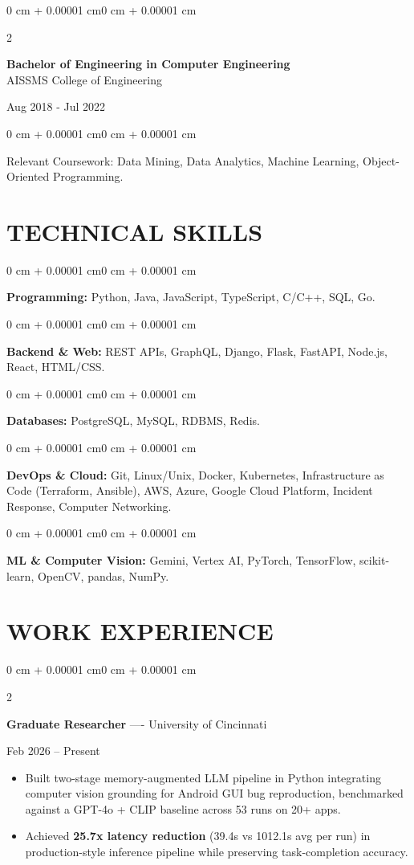 \documentclass[10pt, letterpaper]{article}
\newenvironment{highlights}{
    \begin{itemize}[
        topsep=0.10 cm,
        parsep=0.06 cm,
        partopsep=0pt,
        itemsep=0.06 cm,
        leftmargin=12pt
    ]
}{
    \end{itemize}
}
\newenvironment{onecolentry}{
    \begin{adjustwidth}{0 cm + 0.00001 cm}{0 cm + 0.00001 cm}
}{
    \end{adjustwidth}
}
\newenvironment{twocolentry}[2][]{
    \onecolentry
    \def\secondColumn{#2}
    \setcolumnwidth{\fill, 4.5 cm}
    \begin{paracol}{2}
}{
    \switchcolumn \raggedleft \secondColumn
    \end{paracol}
    \endonecolentry
}
\begin{document}
\begin{twocolentry}{
    Aug 2018 - Jul 2022
}
    \textbf{Bachelor of Engineering in Computer Engineering} \\
    AISSMS College of Engineering
\end{twocolentry}
\begin{onecolentry}
Relevant Coursework: Data Mining, Data Analytics, Machine Learning, Object-Oriented Programming.
\end{onecolentry}
\section{TECHNICAL SKILLS}
\begin{onecolentry}
\textbf{Programming:} Python, Java, JavaScript, TypeScript, C/C++, SQL, Go.
\end{onecolentry}
\vspace{0.06 cm}
\begin{onecolentry}
\textbf{Backend \& Web:} REST APIs, GraphQL, Django, Flask, FastAPI, Node.js, React, HTML/CSS.
\end{onecolentry}
\vspace{0.06 cm}
\begin{onecolentry}
\textbf{Databases:} PostgreSQL, MySQL, RDBMS, Redis.
\end{onecolentry}
\vspace{0.06 cm}
\begin{onecolentry}
\textbf{DevOps \& Cloud:} Git, Linux/Unix, Docker, Kubernetes, Infrastructure as Code (Terraform, Ansible), AWS, Azure, Google Cloud Platform, Incident Response, Computer Networking.
\end{onecolentry}
\vspace{0.06 cm}
\begin{onecolentry}
\textbf{ML \& Computer Vision:} Gemini, Vertex AI, PyTorch, TensorFlow, scikit-learn, OpenCV, pandas, NumPy.
\end{onecolentry}

\section{WORK EXPERIENCE}
\begin{twocolentry}{Feb 2026 -- Present}
\textbf{Graduate Researcher} ---- University of Cincinnati
\end{twocolentry}
\begin{highlights}
  \item Built two-stage memory-augmented LLM pipeline in Python integrating computer vision grounding for Android GUI bug reproduction, benchmarked against a GPT-4o + CLIP baseline across 53 runs on 20+ apps.
  \item Achieved \textbf{25.7x latency reduction} (39.4s vs 1012.1s avg per run) in production-style inference pipeline while preserving task-completion accuracy.
\end{highlights}
\end{document}
